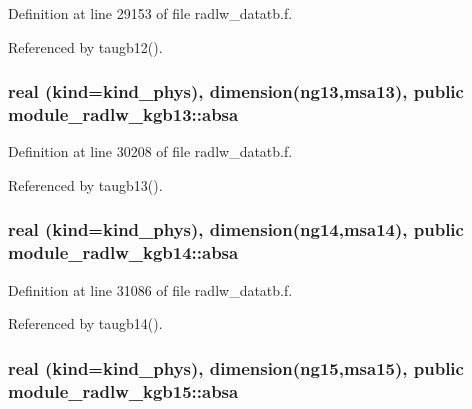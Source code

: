 Definition at line 29153 of file radlw\+\_\+datatb.\+f.



Referenced by taugb12().

\subsubsection[{\texorpdfstring{absa}{absa}}]{\setlength{\rightskip}{0pt plus 5cm}real (kind=kind\+\_\+phys), dimension(ng13,msa13), public module\+\_\+radlw\+\_\+kgb13\+::absa}\hypertarget{group__module__radlw__main_ga22ce8d48ac3dceae1d52e80097fc2689}{}\label{group__module__radlw__main_ga22ce8d48ac3dceae1d52e80097fc2689}


Definition at line 30208 of file radlw\+\_\+datatb.\+f.



Referenced by taugb13().

\subsubsection[{\texorpdfstring{absa}{absa}}]{\setlength{\rightskip}{0pt plus 5cm}real (kind=kind\+\_\+phys), dimension(ng14,msa14), public module\+\_\+radlw\+\_\+kgb14\+::absa}\hypertarget{group__module__radlw__main_gab57cb029ede27280bc99641f39ab3a81}{}\label{group__module__radlw__main_gab57cb029ede27280bc99641f39ab3a81}


Definition at line 31086 of file radlw\+\_\+datatb.\+f.



Referenced by taugb14().

\subsubsection[{\texorpdfstring{absa}{absa}}]{\setlength{\rightskip}{0pt plus 5cm}real (kind=kind\+\_\+phys), dimension(ng15,msa15), public module\+\_\+radlw\+\_\+kgb15\+::absa}\hypertarget{group__module__radlw__main_gaa6412ac501e2afed3d1b64b0cdcdab9e}{}\label{group__module__radlw__main_gaa6412ac501e2afed3d1b64b0cdcdab9e}


